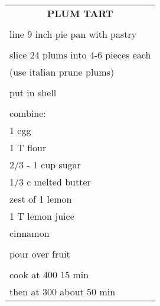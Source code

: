\documentclass[8pt]{report}
\begin{document}
\begin{tabular}{|l|} \hline	%
 
\multicolumn{1}{|c|}{\textbf{PLUM TART}}
\\
\\

\index{desserts!plum tart} \index{plum tart} \index{tart!plum}

line 9 inch pie pan with pastry\\
\\
slice 24 plums into 4-6 pieces each\\
(use italian prune plums)\\
\\
put in shell\\
\\
combine:\\
\hspace{0.5 in}	1 egg\\
\hspace{0.5 in}	1 T flour\\
\hspace{0.5 in}	2/3 - 1 cup sugar\\
\hspace{0.5 in}	1/3 c melted butter\\
\hspace{0.5 in}	zest of 1 lemon\\
\hspace{0.5 in}	1 T lemon juice\\
\hspace{0.5 in}	cinnamon\\
\\
pour over fruit\\
\\
cook at 400 15 min\\
then at 300 about 50 min\\


\hline
\end{tabular}

\newpage


\centering
\end{document}

